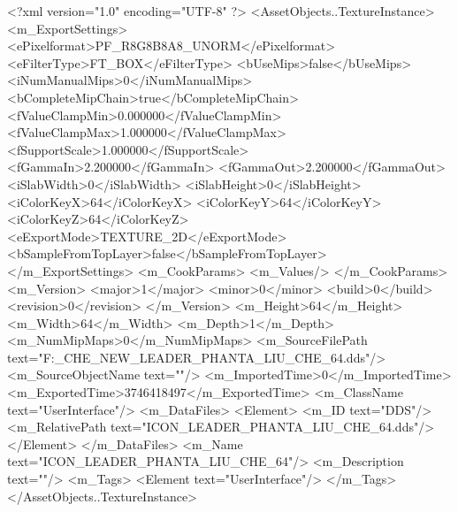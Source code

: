 <?xml version="1.0" encoding="UTF-8" ?>
<AssetObjects..TextureInstance>
	<m_ExportSettings>
		<ePixelformat>PF_R8G8B8A8_UNORM</ePixelformat>
		<eFilterType>FT_BOX</eFilterType>
		<bUseMips>false</bUseMips>
		<iNumManualMips>0</iNumManualMips>
		<bCompleteMipChain>true</bCompleteMipChain>
		<fValueClampMin>0.000000</fValueClampMin>
		<fValueClampMax>1.000000</fValueClampMax>
		<fSupportScale>1.000000</fSupportScale>
		<fGammaIn>2.200000</fGammaIn>
		<fGammaOut>2.200000</fGammaOut>
		<iSlabWidth>0</iSlabWidth>
		<iSlabHeight>0</iSlabHeight>
		<iColorKeyX>64</iColorKeyX>
		<iColorKeyY>64</iColorKeyY>
		<iColorKeyZ>64</iColorKeyZ>
		<eExportMode>TEXTURE_2D</eExportMode>
		<bSampleFromTopLayer>false</bSampleFromTopLayer>
	</m_ExportSettings>
	<m_CookParams>
		<m_Values/>
	</m_CookParams>
	<m_Version>
		<major>1</major>
		<minor>0</minor>
		<build>0</build>
		<revision>0</revision>
	</m_Version>
	<m_Height>64</m_Height>
	<m_Width>64</m_Width>
	<m_Depth>1</m_Depth>
	<m_NumMipMaps>0</m_NumMipMaps>
	<m_SourceFilePath text="F:\MOD\TEMPLATE\LIU_CHE_NEW\ICON_LEADER_PHANTA_LIU_CHE_64.dds"/>
	<m_SourceObjectName text=""/>
	<m_ImportedTime>0</m_ImportedTime>
	<m_ExportedTime>3746418497</m_ExportedTime>
	<m_ClassName text="UserInterface"/>
	<m_DataFiles>
		<Element>
			<m_ID text="DDS"/>
			<m_RelativePath text="ICON_LEADER_PHANTA_LIU_CHE_64.dds"/>
		</Element>
	</m_DataFiles>
	<m_Name text="ICON_LEADER_PHANTA_LIU_CHE_64"/>
	<m_Description text=""/>
	<m_Tags>
		<Element text="UserInterface"/>
	</m_Tags>
</AssetObjects..TextureInstance>

